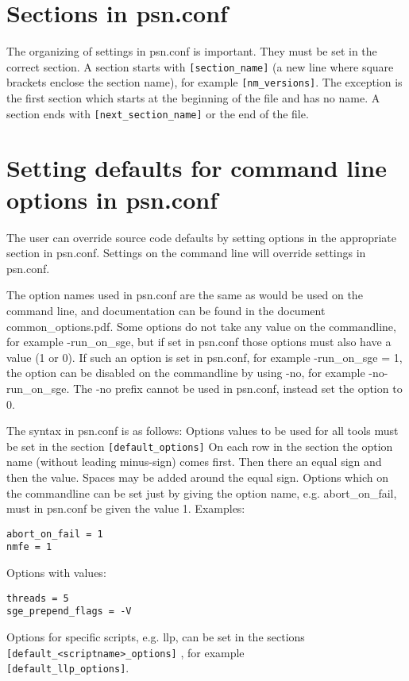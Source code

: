 \section{Sections in psn.conf}
The organizing of settings in psn.conf is important. They must be set in the correct section. A section starts with
\verb|[section_name]| 
(a new line where square brackets enclose the section name), for example
\verb|[nm_versions]|.
The exception is the first section which starts at the beginning of the file and has no name.
A section ends with 
\verb|[next_section_name]|
or the end of the file.

\section{Setting defaults for command line options in psn.conf}
The user can override source code defaults by setting options in the appropriate section in psn.conf. Settings on the command line will override settings in psn.conf. 

The option names used in psn.conf are the same as would be used on the command line, and documentation can be found in the document common\_options.pdf. 
Some options do not take any value on the commandline, for example -run\_on\_sge, but if set in psn.conf those options must also have a value (1 or 0). If such an option is set in psn.conf, for example
-run\_on\_sge = 1, the option can be disabled on the commandline by using -no, for example 
-no-run\_on\_sge. The -no prefix cannot be used in psn.conf, instead set the option to 0.

The syntax in psn.conf is as follows: Options values to be used for all tools must be set in the section \verb|[default_options]| 
On each row in the section the option name (without leading minus-sign) comes first. Then there an equal sign and then the value. Spaces may be added around the equal sign. Options which on the commandline can be set just by giving the option name, e.g. abort\_on\_fail, must in psn.conf be given the value 1. Examples:
\begin{verbatim}
abort_on_fail = 1
nmfe = 1
\end{verbatim}
Options with values:
\begin{verbatim}
threads = 5
sge_prepend_flags = -V 
\end{verbatim}
Options for specific scripts, e.g. llp, can be set in the sections\\
\verb|[default_<scriptname>_options]| , for example\\
 \verb|[default_llp_options]|.

